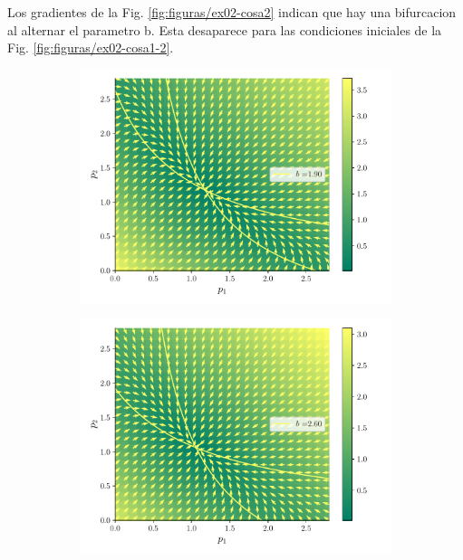 \documentclass[twocolumn,aps,prl]{revtex4-1}
\begin{document}
Los gradientes de la Fig. \ref{fig:figuras/ex02-cosa2} indican que hay una bifurcacion al alternar el parametro b. Esta desaparece para las condiciones iniciales de la Fig. \ref{fig:figuras/ex02-cosa1-2}.

\begin{figure}[ht!]
  \centering
  \begin{subfigure}[b]{0.49\linewidth}
      \centering
      \includegraphics[width = 0.999\textwidth]{figuras/ex02-cosa3-0.pdf}
  \end{subfigure}\quad
  \begin{subfigure}[b]{0.49\linewidth}
      \centering
      \includegraphics[width = 0.999\textwidth]{figuras/ex02-cosa3-1.pdf}
  \end{subfigure}\quad

\end{figure}
\end{document}
